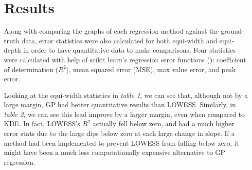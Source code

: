 \documentclass[letterpaper,12pt]{article}
\begin{document}
\section{Results}
Along with comparing the graphs of each regression method against the ground-truth data,
error statistics were also calculated for both equi-width and equi-depth in order to 
have quantitative data to make comparisons. Four statistics were calculated with help of
scikit learn's regression error functions (\cite{scikit-learn}): coefficient of determination
($R^2$), mean squared error (MSE), max value error, and peak error. 
\begin{table}[H]
\centering
{}
\caption{Error statistics for EWH}
\end{table}
Looking at the equi-width statistics in \emph{table 1}, we can see that, although not 
by a large margin, GP had better quantitative results than LOWESS. Similarly, in 
\emph{table 2}, we can see this lead improve by a larger margin, even when compared to KDE. 
In fact, LOWESS's $R^2$ actually fell below zero, and had a much higher error stats due to 
the large dips below zero at each large change in slope. If a method had been implemented to 
prevent LOWESS from falling below zero, it might have been a much less computationally expensive 
alternative to GP regression.
\end{document}
